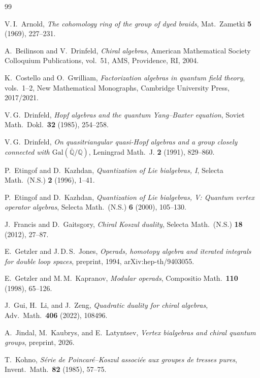\documentclass[11pt,reqno]{amsart}
\theoremstyle{definition}
\theoremstyle{remark}
\numberwithin{equation}{section}
\begin{document}
\begin{thebibliography}{99}

V.\,I.~Arnold,
\textit{The cohomology ring of the group of dyed braids},
Mat.~Zametki \textbf{5} (1969), 227--231.

A.~Beilinson and V.~Drinfeld,
\textit{Chiral algebras},
American Mathematical Society Colloquium Publications, vol.~51,
AMS, Providence, RI, 2004.

K.~Costello and O.~Gwilliam,
\textit{Factorization algebras in quantum field theory},
vols.~1--2, New Mathematical Monographs, Cambridge University
Press, 2017/2021.

V.\,G.~Drinfeld,
\textit{Hopf algebras and the quantum Yang--Baxter equation},
Soviet Math.~Dokl.\ \textbf{32} (1985), 254--258.

V.\,G.~Drinfeld,
\textit{On quasitriangular quasi-Hopf algebras and a group closely
connected with $\mathrm{Gal}(\overline{\mathbb{Q}}/\mathbb{Q})$},
Leningrad Math.~J. \textbf{2} (1991), 829--860.

P.~Etingof and D.~Kazhdan,
\textit{Quantization of Lie bialgebras, I},
Selecta Math.\ (N.S.) \textbf{2} (1996), 1--41.

P.~Etingof and D.~Kazhdan,
\textit{Quantization of Lie bialgebras, V: Quantum vertex
operator algebras},
Selecta Math.\ (N.S.) \textbf{6} (2000), 105--130.

J.~Francis and D.~Gaitsgory,
\textit{Chiral Koszul duality},
Selecta Math.\ (N.S.) \textbf{18} (2012), 27--87.

E.~Getzler and J.\,D.\,S.~Jones,
\textit{Operads, homotopy algebra and iterated integrals for
double loop spaces},
preprint, 1994, arXiv:hep-th/9403055.

E.~Getzler and M.\,M.~Kapranov,
\textit{Modular operads},
Compositio Math.\ \textbf{110} (1998), 65--126.

J.~Gui, H.~Li, and J.~Zeng,
\textit{Quadratic duality for chiral algebras},
Adv.~Math.\ \textbf{406} (2022), 108496.

A.~Jindal, M.~Kaubrys, and E.~Latyntsev,
\textit{Vertex bialgebras and chiral quantum groups},
preprint, 2026.

T.~Kohno,
\textit{S\'erie de Poincar\'e--Koszul associ\'ee aux groupes
de tresses pures},
Invent.~Math.\ \textbf{82} (1985), 57--75.


\end{thebibliography}
\end{document}
